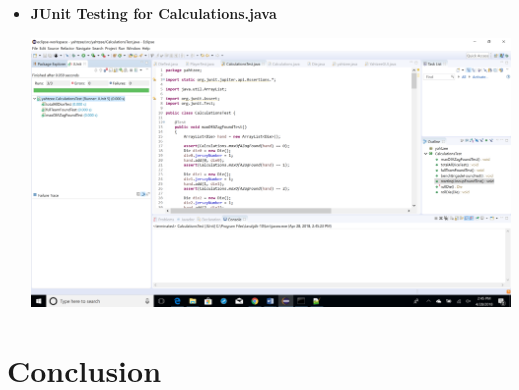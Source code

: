 \documentclass[]{report}   %
\begin{document}
\begin{itemize}
\vspace{.2in}

\item \textbf{JUnit Testing for Calculations.java}
\begin{center}
\includegraphics[width=6in]{Graphics/JUnitTestCalculationsTestScreenshot.png}
\end{center}

\end{itemize}




\chapter{Conclusion}           %
\end{document}
